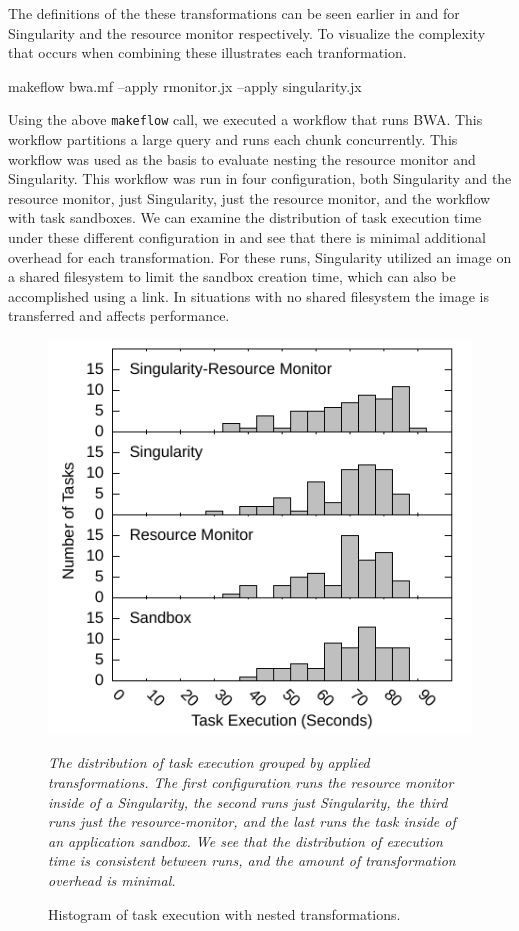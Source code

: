 \documentclass[conference]{IEEEtran}
\begin{document}
The definitions of the these transformations can
be seen earlier in  and 
for Singularity and the resource monitor respectively.
To visualize the complexity that occurs when combining these
 illustrates each tranformation.


\begin{framed}
\noindent
{\small makeflow bwa.mf --apply rmonitor.jx --apply singularity.jx}
\end{framed}

Using the above {\tt makeflow} call, we executed a workflow 
that runs BWA\cite{pmid20080505}.
This workflow partitions a large query and runs 
each chunk concurrently. 
This workflow was used as the basis to evaluate 
nesting the resource monitor and Singularity.
This workflow was run in four configuration,
both Singularity and the resource monitor,
just Singularity,
just the resource monitor,
and the workflow with task sandboxes.
We can examine the distribution of task
execution time under these different 
configuration in 
and see that there is minimal additional
overhead for each transformation.
For these runs, Singularity utilized
an image on a shared filesystem to
limit the sandbox creation time,
which can also be accomplished using
a link. In situations with no shared
filesystem the image is transferred
and affects performance.


\begin{figure}
\includegraphics[width=\columnwidth]{graphics/divide_hist.pdf}
\caption{Histogram of task execution with nested transformations.}
\small
\emph{The distribution of task execution grouped by applied
transformations. 
The first configuration runs the resource monitor inside of
a Singularity, the second runs just Singularity,
the third runs just the resource-monitor, and the last
runs the task inside of an application sandbox.
We see that the distribution of execution
time is consistent between runs, and the amount of 
transformation overhead is minimal.
}
\label{figure:nest-task}
\end{figure}
\end{document}
